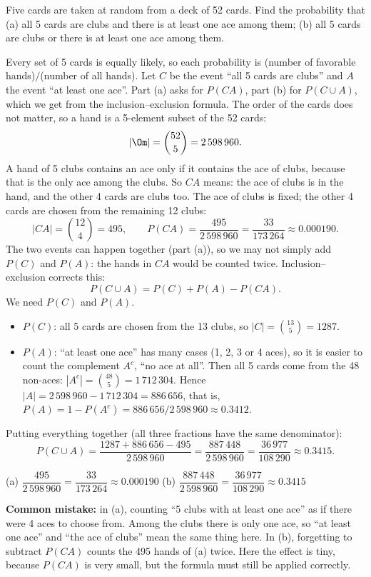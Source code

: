 
\begin{problem}
	Five cards are taken at random from a deck of 52 cards. Find the
	probability that
	(a) all 5 cards are clubs and there is at least one ace among them;
	(b) all 5 cards are clubs or there is at least one ace among them.
\end{problem}

\begin{solution}
	\idea Every set of 5 cards is equally likely, so each probability is
	(number of favorable hands)$/$(number of all hands). Let $C$ be the event
	``all 5 cards are clubs'' and $A$ the event ``at least one ace''. Part (a)
	asks for $P(CA)$, part (b) for $P(C\cup A)$, which we get from the
	inclusion--exclusion formula.
	 The order of the cards does not matter, so a hand is
	a 5-element subset of the 52 cards:
	\[ |\Om|=\binom{52}{5}=2\,598\,960. \]
	 A hand of 5 clubs contains an ace only if it contains the ace
	of clubs, because that is the only ace among the clubs. So $CA$ means:
	the ace of clubs is in the hand, and the other 4 cards are clubs too.
	The ace of clubs is fixed; the other 4 cards are chosen from the remaining
	12 clubs:
	\[ |CA|=\binom{12}{4}=495,\qquad
		P(CA)=\frac{495}{2\,598\,960}=\frac{33}{173\,264}\approx0.000190. \]
	 The two events can happen together (part (a)), so we may not
	simply add $P(C)$ and $P(A)$: the hands in $CA$ would be counted twice.
	Inclusion--exclusion corrects this:
	\[ P(C\cup A)=P(C)+P(A)-P(CA). \]
	We need $P(C)$ and $P(A)$.
	\begin{itemize}
		\item $P(C)$: all 5 cards are chosen from the 13 clubs, so
		$|C|=\binom{13}{5}=1287$.
		\item $P(A)$: ``at least one ace'' has many cases (1, 2, 3 or 4 aces),
		so it is easier to count the complement $A^c$, ``no ace at all''. Then
		all 5 cards come from the 48 non-aces: $|A^c|=\binom{48}{5}=1\,712\,304$.
		Hence $|A|=2\,598\,960-1\,712\,304=886\,656$, that is,
		$P(A)=1-P(A^c)=886\,656/2\,598\,960\approx0.3412$.
	\end{itemize}
	Putting everything together (all three fractions have the same
	denominator):
	\[ P(C\cup A)=\frac{1287+886\,656-495}{2\,598\,960}
		=\frac{887\,448}{2\,598\,960}=\frac{36\,977}{108\,290}\approx0.3415. \]
	\begin{answer}
		(a) $\dfrac{495}{2\,598\,960}=\dfrac{33}{173\,264}\approx0.000190$
		\quad
		(b) $\dfrac{887\,448}{2\,598\,960}=\dfrac{36\,977}{108\,290}\approx0.3415$
	\end{answer}
	\begin{remark}
		\textbf{Common mistake:} in (a), counting ``5 clubs with at least one
		ace'' as if there were 4 aces to choose from. Among the clubs there is
		only one ace, so ``at least one ace'' and ``the ace of clubs'' mean the
		same thing here. In (b), forgetting to subtract $P(CA)$ counts the 495
		hands of (a) twice. Here the effect is tiny, because $P(CA)$ is very
		small, but the formula must still be applied correctly.
	\end{remark}
\end{solution}
